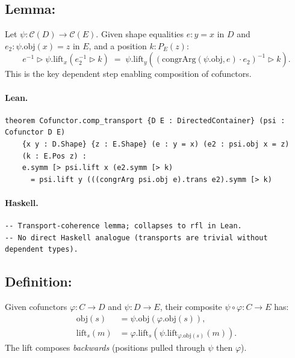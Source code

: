 \documentclass[11pt,a4paper]{article}
\begin{document}
\subsection{Lemma: }

\begin{prop}
Let $\psi : \mathcal{C}(D) \to \mathcal{C}(E)$.  Given shape equalities
$e : y = x$ in $D$ and $e_2 : \psi.\mathrm{obj}(x) = z$ in $E$, and a
position $k : P_E(z)$:
\[
  e^{-1} \triangleright \psi.\mathrm{lift}_x(e_2^{-1} \triangleright k)
  \;=\;
  \psi.\mathrm{lift}_y((\mathrm{congrArg}(\psi.\mathrm{obj}, e) \cdot e_2)^{-1} \triangleright k).
\]
This is the key dependent step enabling composition of cofunctors.
\end{prop}

\paragraph{Lean.}
\begin{lstlisting}[style=lean]
theorem Cofunctor.comp_transport {D E : DirectedContainer} (psi : Cofunctor D E)
    {x y : D.Shape} {z : E.Shape} (e : y = x) (e2 : psi.obj x = z)
    (k : E.Pos z) :
    e.symm [> psi.lift x (e2.symm [> k)
      = psi.lift y (((congrArg psi.obj e).trans e2).symm [> k)
\end{lstlisting}

\paragraph{Haskell.}
\begin{lstlisting}[style=haskell]
-- Transport-coherence lemma; collapses to rfl in Lean.
-- No direct Haskell analogue (transports are trivial without dependent types).
\end{lstlisting}


\subsection{Definition: }

\begin{defn}
Given cofunctors $\varphi : C \to D$ and $\psi : D \to E$, their composite
$\psi \circ \varphi : C \to E$ has:
\begin{align*}
  \mathrm{obj}(s) &= \psi.\mathrm{obj}(\varphi.\mathrm{obj}(s)), \\
  \mathrm{lift}_s(m) &= \varphi.\mathrm{lift}_s(\psi.\mathrm{lift}_{\varphi.\mathrm{obj}(s)}(m)).
\end{align*}
The lift composes \emph{backwards} (positions pulled through $\psi$ then $\varphi$).
\end{defn}
\end{document}
